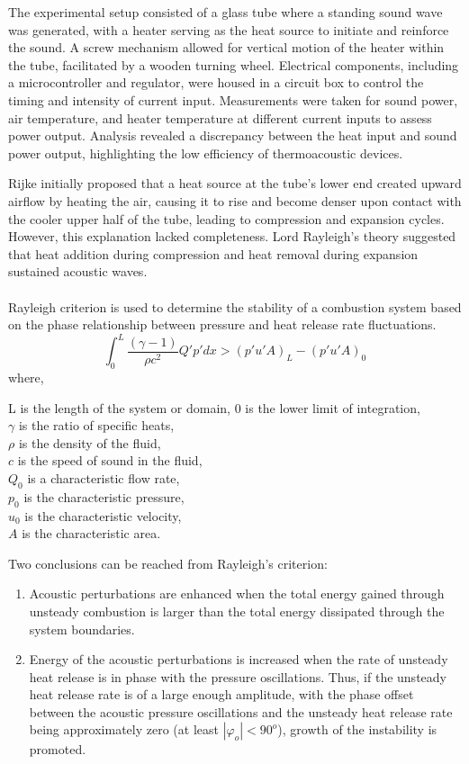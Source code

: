 \documentclass[8pt]{article} %
\begin{document}
The experimental setup\cite{Rijke Tube Paper} consisted of a glass tube where a standing sound wave was generated, with a heater serving as the heat source to initiate and reinforce the sound. A screw mechanism allowed for vertical motion of the heater within the tube, facilitated by a wooden turning wheel. Electrical components, including a microcontroller and regulator, were housed in a circuit box to control the timing and intensity of current input. Measurements were taken for sound power, air temperature, and heater temperature at different current inputs to assess power output. Analysis revealed a discrepancy between the heat input and sound power output, highlighting the low efficiency of thermoacoustic devices.

Rijke initially proposed that a heat source at the tube's lower end created upward airflow by heating the air, causing it to rise and become denser upon contact with the cooler upper half of the tube, leading to compression and expansion cycles. However, this explanation lacked completeness. Lord Rayleigh's theory suggested that heat addition during compression and heat removal during expansion sustained acoustic waves.\\\\
Rayleigh criterion is used to determine the stability of a combustion system based on the phase relationship between pressure and heat release rate fluctuations. \cite{CI in LRE}
\begin{equation}
    \int_{0}^{L} \frac{\left( \gamma - 1 \right)}{\rho c^{2}} Q' p' dx > \left(p' u' A \right)_{L} - \left(p' u' A \right)_{0}
\end{equation}
where,
\begin{center}
L is the length of the system or domain, 0 is the lower limit of integration,\\
$\gamma$ is the ratio of specific heats,\\
$\rho$ is the density of the fluid,\\
$c$ is the speed of sound in the fluid,\\
$Q_{0}$ is a characteristic flow rate,\\
$p_{0}$ is the characteristic pressure,\\
$u_{0}$ is the characteristic velocity,\\
$A$ is the characteristic area.\\
\end{center}
Two conclusions can be reached from Rayleigh’s criterion: 
\begin{enumerate}
	\item Acoustic perturbations are enhanced when the total energy gained through unsteady combustion is larger than the total energy dissipated through the system boundaries.
	\item Energy of the acoustic perturbations is increased when the rate of unsteady heat release is in phase with the pressure oscillations. Thus, if the unsteady heat release rate is of a large enough amplitude, with the phase offset between the acoustic pressure oscillations and the unsteady heat release rate being approximately zero (at least $|φ_{o}| < 90^{o}$), growth of the instability is promoted.
\end{enumerate}
\end{document}
